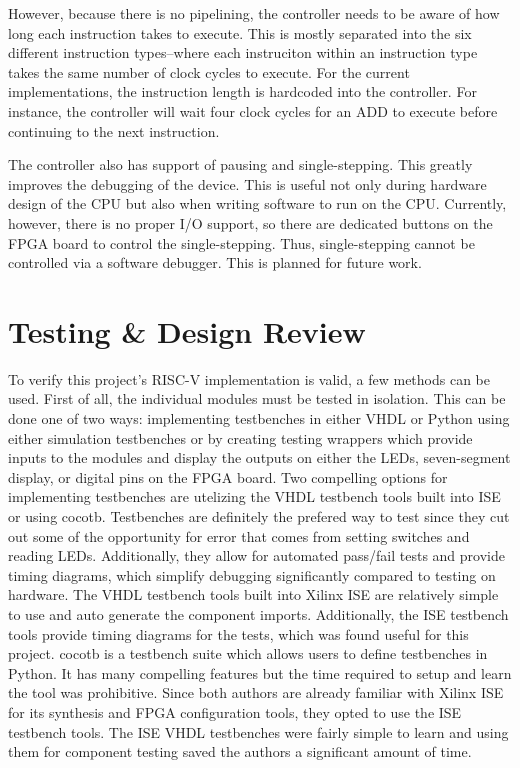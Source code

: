 \documentclass[lettersize,journal]{IEEEtran}
\begin{document}
However, because there is no pipelining, the controller needs to be aware of how long each instruction takes to execute.
This is mostly separated into the six different instruction types--where each instruciton within an instruction type takes the same number of clock cycles to execute.
For the current implementations, the instruction length is hardcoded into the controller. For instance, the controller will wait four clock cycles for an ADD to execute
before continuing to the next instruction.

The controller also has support of pausing and single-stepping.
This greatly improves the debugging of the device.
This is useful not only during hardware design of the CPU but also when writing software to run on the CPU.
Currently, however, there is no proper I/O support, so there are dedicated buttons on the FPGA board to control the single-stepping.
Thus, single-stepping cannot be controlled via a software debugger.
This is planned for future work.

\section{Testing \& Design Review}
To verify this project's RISC-V implementation is valid, a few methods can be used. First of all, the individual modules must be tested in isolation.
This can be done one of two ways: implementing testbenches in either VHDL or Python using either simulation testbenches or by creating testing wrappers which provide inputs to the modules and display the outputs on either the LEDs, seven-segment display, or digital pins on the FPGA board.
Two compelling options for implementing testbenches are utelizing the VHDL testbench tools built into ISE or using cocotb.
Testbenches are definitely the prefered way to test since they cut out some of the opportunity for error that comes from setting switches and reading LEDs.
Additionally, they allow for automated pass/fail tests and provide timing diagrams, which simplify debugging significantly compared to testing on hardware.
The VHDL testbench tools built into Xilinx ISE are relatively simple to use and auto generate the component imports.
Additionally, the ISE testbench tools provide timing diagrams for the tests, which was found useful for this project.
cocotb is a testbench suite which allows users to define testbenches in Python.
It has many compelling features but the time required to setup and learn the tool was prohibitive.
Since both authors are already familiar with Xilinx ISE for its synthesis and FPGA configuration tools, they opted to use the ISE testbench tools.
The ISE VHDL testbenches were fairly simple to learn and using them for component testing saved the authors a significant amount of time.
\end{document}
